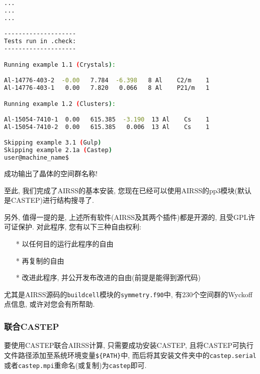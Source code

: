 \documentclass[a4paper, 10pt]{article}
\begin{document}
\begin{description}
\begin{lstlisting}[language={bash}]
...
...
...

--------------------
Tests run in .check:
--------------------

Running example 1.1 (Crystals):

Al-14776-403-2  -0.00   7.784  -6.398   8 Al    C2/m    1
Al-14776-403-1   0.00   7.820   0.066   8 Al    P21/m   1

Running example 1.2 (Clusters):

Al-15054-7410-1  0.00   615.385  -3.190  13 Al    Cs    1
Al-15054-7410-2  0.00   615.385   0.006  13 Al    Cs    1

Skipping example 3.1 (Gulp)
Skipping example 2.1a (Castep)
user@machine_name$
        \end{lstlisting}
      \end{description}

      成功输出了晶体的空间群名称! 

      至此, 我们完成了AIRSS的基本安装, 您现在已经可以使用AIRSS的pp3模块(默认是CASTEP)进行结构搜寻了.

      另外, 值得一提的是, 上述所有软件(AIRSS及其两个插件)都是开源的, 且受GPL许可证保护. 对此程序, 您有以下三种自由权利:
      \begin{enumerate}
        \item [*]以任何目的运行此程序的自由
        \item [*]再复制的自由
        \item [*]改进此程序, 并公开发布改进的自由(前提是能得到源代码)
      \end{enumerate}
      
      尤其是AIRSS源码的\verb|buildcell|模块的\verb|symmetry.f90|中, 有230个空间群的Wyckoff点信息, 或许对您会有所帮助.
      
      \subsubsection{联合CASTEP}
      要使用CASTEP联合AIRSS计算, 只需要成功安装CASTEP, 且将CASTEP可执行文件路径添加至系统环境变量\verb|${PATH}|中, 而后将其安装文件夹中的\verb|castep.serial|或者\verb|castep.mpi|重命名(或复制)为\verb|castep|即可.
\end{document}
